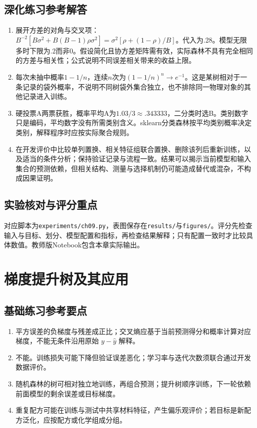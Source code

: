 \section*{深化练习参考解答}
\begin{enumerate}[label=D\arabic*.]
\item 展开方差的对角与交叉项：$B^{-2}[B\sigma^2+B(B-1)\rho\sigma^2]=\sigma^2[\rho+(1-\rho)/B]$。代入为.28。模型无限多时下限为.2而非0。假设简化且协方差矩阵需有效，实际森林不具有完全相同的方差与相关性；公式说明不同误差相关带来的收益上限。
\item 每次未抽中概率$1-1/n$，连续$n$次为$(1-1/n)^n\to e^{-1}$。这是某树相对于一条记录的袋外概率，不说明不同树袋外集合独立，也不排除同一物理对象的其他记录进入训练。
\item 硬投票A两票获胜，概率平均A为$1.03/3\approx.343333$，二分类时选B。类别数字只是编码，平均数字没有所需类别含义。sklearn分类森林按平均类别概率决定类别，解释程序时应按实际聚合规则。
\item 在开发评价中比较单列置换、相关特征组联合置换、删除该列后重新训练，以及适当的条件分析；保持验证记录与流程一致。结果可以揭示当前模型和输入集合的预测依赖，但相关结构、测量与选择机制仍可能造成替代或混杂，不构成因果证明。
\end{enumerate}

\section*{实验核对与评分重点}
对应脚本为\texttt{experiments/ch09.py}，表图保存在\texttt{results/}与\texttt{figures/}。评分先检查输入与目标、划分、模型配置和指标，再检查结果解释；只有配置一致时才比较具体数值。教师版Notebook包含本章实际输出。

\chapter{梯度提升树及其应用}
\section*{基础练习参考要点}
\begin{enumerate}[label=\arabic*.]
\item 平方误差的负梯度与残差成正比；交叉熵应基于当前预测得分和概率计算对应梯度，不能无条件沿用原始 $y-\hat y$ 解释。
\item 不能。训练损失可能下降但验证误差恶化；学习率与迭代次数须联合通过开发数据评价。
\item 随机森林的树可相对独立地训练，再组合预测；提升树顺序训练，下一轮依赖前面模型的剩余误差或目标梯度。
\item 重复配方可能在训练与测试中共享材料特征，产生偏乐观评价；若目标是新配方泛化，应按配方或化学组成分组。
\end{enumerate}
